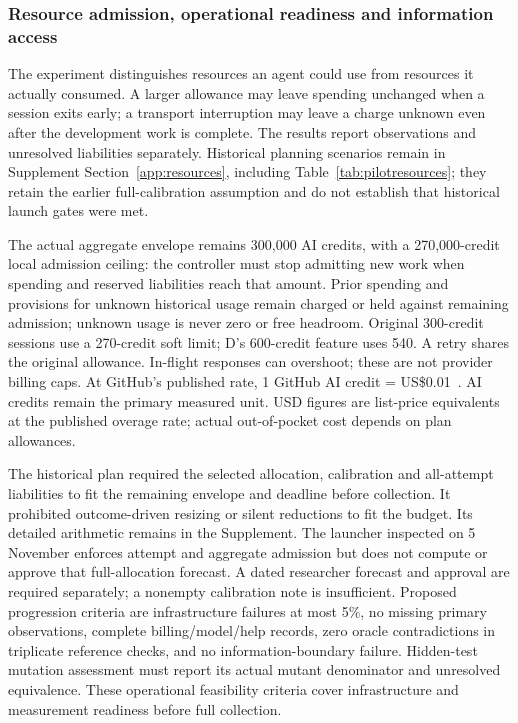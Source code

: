 \subsubsection{Resource admission, operational readiness and information access}

The experiment distinguishes resources an agent could use from resources
it actually consumed. A larger allowance may leave spending unchanged
when a session exits early; a transport interruption may leave a charge
unknown even after the development work is complete. The results report
observations and unresolved liabilities separately. Historical planning
scenarios remain in Supplement Section~\ref{app:resources}, including
Table~\ref{tab:pilotresources}; they retain the earlier full-calibration
assumption and do not establish that historical launch gates were met.

The actual aggregate envelope remains 300,000 AI credits, with a
270,000-credit local admission ceiling: the controller must stop admitting
new work when spending and reserved liabilities reach that amount.
Prior spending and provisions for
unknown historical usage remain charged or held against remaining
admission; unknown usage is never zero or free headroom.
Original 300-credit sessions use a 270-credit soft limit; D's
600-credit feature uses 540. A retry shares the original allowance.
In-flight responses can overshoot; these are not provider billing caps.
At GitHub's published rate, 1 GitHub AI credit = US\$0.01~\cite{githubcopilotpricing}.
AI credits remain the primary measured unit. USD figures are list-price
equivalents at the published overage rate; actual out-of-pocket cost depends
on plan allowances.

The historical plan required the selected allocation, calibration and
all-attempt liabilities to fit the remaining envelope and deadline before
collection. It prohibited outcome-driven resizing or silent reductions to
fit the budget. Its detailed arithmetic remains in the Supplement.
The launcher inspected on 5 November enforces attempt and aggregate admission but does
not compute or approve that full-allocation forecast. A dated researcher
forecast and approval are required separately; a nonempty calibration
note is insufficient.
Proposed progression criteria are infrastructure failures at
most 5\%, no missing primary observations, complete billing/model/help
records, zero oracle contradictions in triplicate reference checks,
and no information-boundary failure. Hidden-test mutation assessment
must report its actual mutant denominator and unresolved equivalence.
These operational feasibility criteria cover infrastructure and measurement
readiness before full collection.

